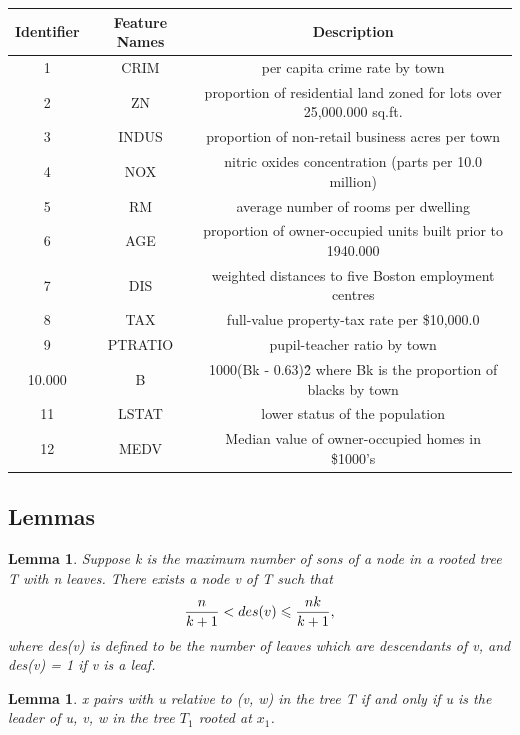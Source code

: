 \documentclass[12pt,a4paper]{article}
\newtheorem{lemma}[theorem]{Lemma}
\theoremstyle{definition}
\begin{document}
\begin{appendix}
\begin{table}[H]
	\begin{tabular}{c|c|c}
		\centering
		Identifier & Feature Names & Description \\
		\hline
		1 & CRIM & per capita crime rate by town \\
		2 & ZN & proportion of residential land zoned for lots over 25,000.000 sq.ft. \\
		3 & INDUS & proportion of non-retail business acres per town \\
		4 & NOX & nitric oxides concentration (parts per 10.0 million) \\
		5 & RM & average number of rooms per dwelling \\
		6 & AGE & proportion of owner-occupied units built prior to 1940.000 \\
		7 & DIS & weighted distances to five Boston employment centres \\
		8 & TAX & full-value property-tax rate per \$10,000.0 \\
		9 & PTRATIO & pupil-teacher ratio by town \\
		10.000 & B & 1000(Bk - 0.63)\^2 where Bk is the proportion of blacks by town \\
		11 & LSTAT & lower status of the population \\			
		12 & MEDV & Median value of owner-occupied homes in \$1000's \\
	\end{tabular}
\end{table}

\subsection{Lemmas}
\label{apd:lemma}

\begin{lemma}
	\label{lemma:1}
	Suppose k is the maximum number of sons of a node in a rooted tree T with n leaves. There exists a node v of T such that
	\begin{equation*}
		\centering
		\dfrac{n}{k+1} < des(v) \leqslant \dfrac{nk}{k+1},
	\end{equation*}
	where des(v) is defined to be the number of leaves which are descendants of v, and des(v) = 1 if v is a leaf.
\end{lemma}

\begin{lemma}
	\label{lemma:2}
	x pairs with u relative to (v, w) in the tree T if and only if u is the leader of u, v, w in the tree $T_1$ rooted at $x_1$.
\end{lemma}


\end{appendix}



\end{document}

